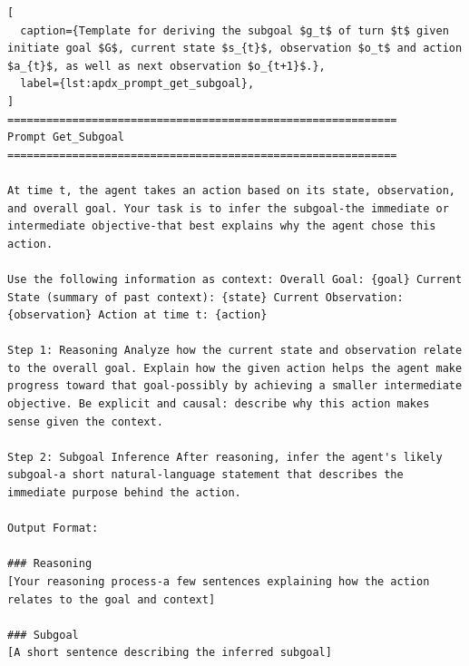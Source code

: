 \begin{lstlisting}[
  caption={Template for deriving the subgoal $g_t$ of turn $t$ given initiate goal $G$, current state $s_{t}$, observation $o_t$ and action $a_{t}$, as well as next observation $o_{t+1}$.},
  label={lst:apdx_prompt_get_subgoal},
]
============================================================
Prompt Get_Subgoal
============================================================

At time t, the agent takes an action based on its state, observation, and overall goal. Your task is to infer the subgoal-the immediate or intermediate objective-that best explains why the agent chose this action.

Use the following information as context: Overall Goal: {goal} Current State (summary of past context): {state} Current Observation: {observation} Action at time t: {action}

Step 1: Reasoning Analyze how the current state and observation relate to the overall goal. Explain how the given action helps the agent make progress toward that goal-possibly by achieving a smaller intermediate objective. Be explicit and causal: describe why this action makes sense given the context.

Step 2: Subgoal Inference After reasoning, infer the agent's likely subgoal-a short natural-language statement that describes the immediate purpose behind the action.

Output Format:

### Reasoning
[Your reasoning process-a few sentences explaining how the action relates to the goal and context]

### Subgoal
[A short sentence describing the inferred subgoal]
\end{lstlisting}
